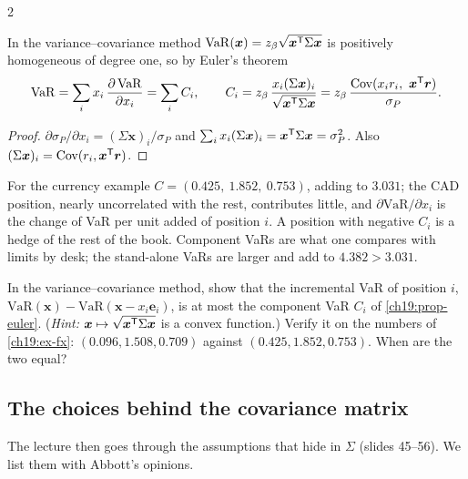 \begin{paracol}{2}
\begin{proposition}\label{ch19:prop-euler}
In the variance--covariance method $\mathrm{VaR}(\bm x)=z_\beta\sqrt{\bm x^{\mathsf T}\Sigma\bm x}$ is positively homogeneous of degree one, so by Euler's theorem
\[
  \mathrm{VaR}=\sum_ix_i\,\frac{\partial\,\mathrm{VaR}}{\partial x_i}=\sum_iC_i,\qquad
  C_i=z_\beta\,\frac{x_i(\Sigma\bm x)_i}{\sqrt{\bm x^{\mathsf T}\Sigma\bm x}}=z_\beta\,\frac{\operatorname{Cov}(x_ir_i,\ \bm x^{\mathsf T}\bm r)}{\sigma_P}.
\]
\end{proposition}
\begin{proof}
$\partial\sigma_P/\partial x_i=(\Sigma\bm x)_i/\sigma_P$ and $\sum_ix_i(\Sigma\bm x)_i=\bm x^{\mathsf T}\Sigma\bm x=\sigma_P^2$. Also $(\Sigma\bm x)_i=\operatorname{Cov}(r_i,\bm x^{\mathsf T}\bm r)$.
\end{proof}
For the currency example $C=(0.425,\ 1.852,\ 0.753)$, adding to $3.031$; the CAD position, nearly uncorrelated with the rest, contributes little, and $\partial\mathrm{VaR}/\partial x_i$ is the change of VaR per unit added of position $i$. A position with negative $C_i$ is a hedge of the rest of the book. Component VaRs are what one compares with limits by desk; the stand-alone VaRs are larger and add to $4.382>3.031$.

\begin{exercise}
In the variance--covariance method, show that the incremental VaR of position $i$, $\mathrm{VaR}(\bm x)-\mathrm{VaR}(\bm x-x_i\bm e_i)$, is at most the component VaR $C_i$ of \cref{ch19:prop-euler}. (\emph{Hint:} $\bm x\mapsto\sqrt{\bm x^{\mathsf T}\Sigma\bm x}$ is a convex function.) Verify it on the numbers of \cref{ch19:ex-fx}: $(0.096,1.508,0.709)$ against $(0.425,1.852,0.753)$. When are the two equal?
\end{exercise}

\subsection{The choices behind the covariance matrix}\label{ch19:sec-assump}
The lecture then goes through the assumptions that hide in $\Sigma$ (slides 45--56). We list them with Abbott's opinions.


\end{paracol}
